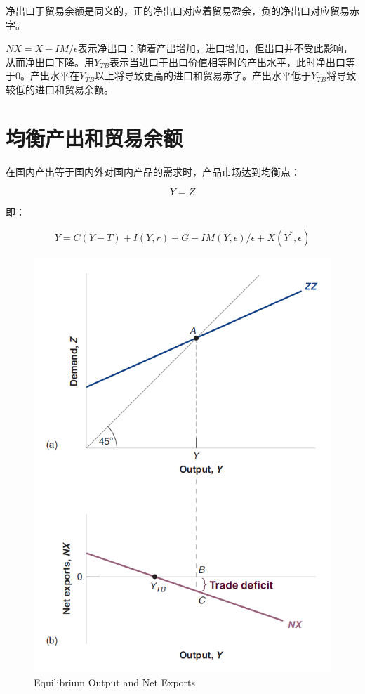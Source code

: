 \documentclass{article}
\begin{document}
净出口于贸易余额是同义的，正的净出口对应着贸易盈余，负的净出口对应贸易赤字。

$ NX=X-IM/\epsilon $表示净出口：随着产出增加，进口增加，但出口并不受此影响，从而净出口下降。用$ Y_{TB} $表示当进口于出口价值相等时的产出水平，此时净出口等于0。产出水平在$ Y_{TB} $以上将导致更高的进口和贸易赤字。产出水平低于$ Y_{TB} $将导致较低的进口和贸易余额。

\section{均衡产出和贸易余额}

在国内产出等于国内外对国内产品的需求时，产品市场达到均衡点：

\[
Y=Z
\]

即：

\[
Y=C(Y-T)+I(Y,r)+G-IM(Y,\epsilon)/\epsilon+X(Y^*,\epsilon)
\]

\begin{figure}[H] %
	\centering %
	\includegraphics[width=1\textwidth]{18_3} %
	\caption{Equilibrium Output and
		Net Exports} %
	\label{Fig.main4} %
\end{figure}
\end{document}
